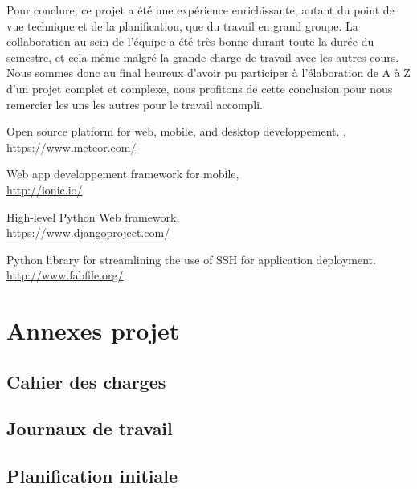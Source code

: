 \documentclass[french]{article}
\begin{document}
		Pour conclure, ce projet a été une expérience enrichissante, autant du point de vue technique et de la planification, que du travail en grand groupe. La collaboration au sein de l'équipe a été très bonne durant toute la durée du semestre, et cela même malgré la grande charge de travail avec les autres cours. Nous sommes donc au final heureux d'avoir pu participer à l'élaboration de A à Z d'un projet complet et complexe, nous profitons de cette conclusion pour nous remercier les uns les autres pour le travail accompli.
		
		\newpage
	
	\newpage
	

			
	
	\listoffigures
			
	\begin{thebibliography}{9}
		Open source platform for web, mobile, and desktop developpement. ,\\ \url{https://www.meteor.com/}
		
		Web app developpement framework for mobile,\\ \url{http://ionic.io/}
		
		High-level Python Web framework, \\ \url{https://www.djangoproject.com/}
		
		Python library for streamlining the use of SSH for application deployment.\\ \url{http://www.fabfile.org/}
	\end{thebibliography}
			
	\newpage
		
		
	\section{Annexes projet}
		\subsection{Cahier des charges}
			
		\subsection{Journaux de travail}
		
		\subsection{Planification initiale}
				
\end{document}
